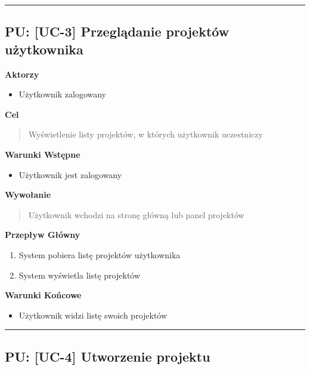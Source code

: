 \hrule
\vspace{1cm}

\subsection*{PU: [UC-3] Przeglądanie projektów użytkownika}

\noindent\textbf{Aktorzy}
\begin{itemize}
    \item Użytkownik zalogowany
\end{itemize}

\vspace{0.2cm}
\noindent\textbf{Cel}
\begin{quote}
    Wyświetlenie listy projektów, w których użytkownik uczestniczy
\end{quote}

\vspace{0.2cm}
\noindent\textbf{Warunki Wstępne}
\begin{itemize}
    \item Użytkownik jest zalogowany
\end{itemize}

\vspace{0.2cm}
\noindent\textbf{Wywołanie}
\begin{quote}
    Użytkownik wchodzi na stronę główną lub panel projektów
\end{quote}

\vspace{0.2cm}
\noindent\textbf{Przepływ Główny}
\begin{enumerate}
    \item System pobiera listę projektów użytkownika
    \item System wyświetla listę projektów
\end{enumerate}

\vspace{0.2cm}
\noindent\textbf{Warunki Końcowe}
\begin{itemize}
    \item Użytkownik widzi listę swoich projektów
\end{itemize}


\hrule
\vspace{1cm}

\subsection*{PU: [UC-4] Utworzenie projektu}

